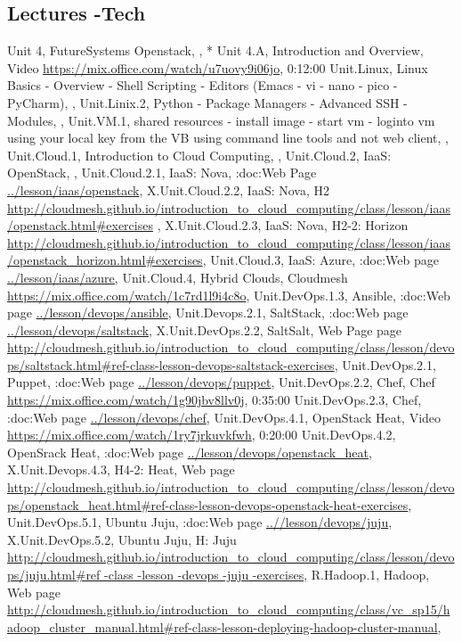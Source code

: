 \subsection{Lectures -Tech}

Unit 4, FutureSystems Openstack, , 
* Unit 4.A, Introduction and Overview, Video \url{https://mix.office.com/watch/u7uovy9i06jo}, 0:12:00
Unit.Linux, Linux Basics - Overview - Shell Scripting -  Editors (Emacs - vi - nano - pico - PyCharm), ,
Unit.Linix.2, Python - Package Managers - Advanced SSH - Modules, ,
Unit.VM.1, shared resources - install image -  start vm -  loginto vm using your local key from the VB using command line tools and not web client, ,
Unit.Cloud.1, Introduction to Cloud Computing, , 
Unit.Cloud.2, IaaS: OpenStack, ,
Unit.Cloud.2.1, IaaS: Nova, :doc:Web Page \url{../lesson/iaas/openstack},
X.Unit.Cloud.2.2, IaaS: Nova, H2 \url{http://cloudmesh.github.io/introduction_to_cloud_computing/class/lesson/iaas/openstack.html#exercises} ,
X.Unit.Cloud.2.3, IaaS: Nova, H2-2: Horizon \url{http://cloudmesh.github.io/introduction_to_cloud_computing/class/lesson/iaas/openstack_horizon.html#exercises},
Unit.Cloud.3, IaaS: Azure, :doc:Web page \url{../lesson/iaas/azure},  
Unit.Cloud.4, Hybrid Clouds, Cloudmesh \url{https://mix.office.com/watch/1c7rd1l9i4c8o},
Unit.DevOps.1.3, Ansible, :doc:Web page \url{../lesson/devops/ansible},
Unit.Devops.2.1, SaltStack, :doc:Web page \url{../lesson/devops/saltstack}, 
X.Unit.DevOps.2.2, SaltSalt, Web Page page \url{http://cloudmesh.github.io/introduction_to_cloud_computing/class/lesson/devops/saltstack.html#ref-class-lesson-devops-saltstack-exercises}, 
Unit.DevOps.2.1, Puppet, :doc:Web page \url{../lesson/devops/puppet}, 
Unit.DevOps.2.2, Chef, Chef \url{https://mix.office.com/watch/1g90jbv8llv0j}, 0:35:00
Unit.DevOps.2.3, Chef, :doc:Web page \url{../lesson/devops/chef}, 
Unit.DevOps.4.1, OpenStack Heat, Video \url{https://mix.office.com/watch/1ry7jrkuvkfwh}, 0:20:00
Unit.DevOps.4.2, OpenSrack Heat, :doc:Web page \url{../lesson/devops/openstack_heat}, 
X.Unit.Devops.4.3, H4-2: Heat, Web page \url{http://cloudmesh.github.io/introduction_to_cloud_computing/class/lesson/devops/openstack_heat.html#ref-class-lesson-devops-openstack-heat-exercises}, 
Unit.DevOps.5.1, Ubuntu Juju, :doc:Web page \url{..//lesson/devops/juju}, 
X.Unit.DevOps.5.2, Ubuntu Juju, H: Juju  \url{http://cloudmesh.github.io/introduction_to_cloud_computing/class/lesson/devops/juju.html#ref -class -lesson -devops -juju -exercises}, 
R.Hadoop.1, Hadoop, Web page \url{http://cloudmesh.github.io/introduction_to_cloud_computing/class/vc_sp15/hadoop_cluster_manual.html#ref-class-lesson-deploying-hadoop-cluster-manual}, 
